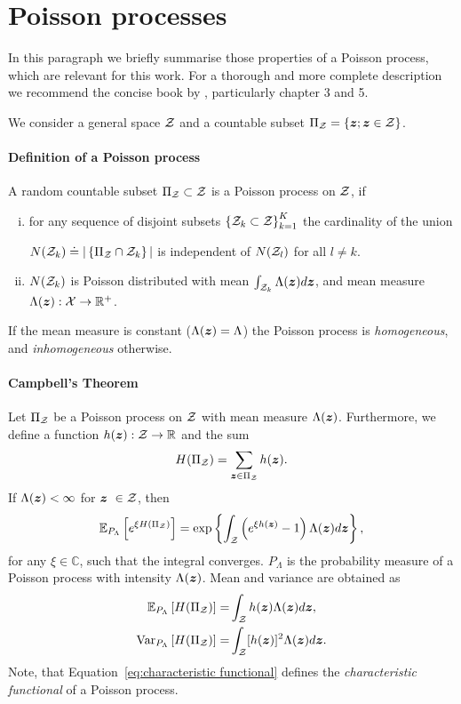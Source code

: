 \appendix

\section{Poisson processes}\label{app:poisson process}
In this paragraph we briefly summarise those properties of a Poisson process, which are relevant for this work.
For a thorough and more complete description we recommend the concise book by \citet{kingman1993poisson}, particularly chapter 3 and 5.

We consider a general space $\mathcal{Z}$ and a countable subset $\Pi_{\mathcal{Z}} = \left\lbrace \boldsymbol{z};\boldsymbol{z}\in \mathcal{Z} \right\rbrace$.

\paragraph{Definition of a Poisson process} A random countable subset $\Pi_{\mathcal{Z}} \subset \mathcal{Z}$ is a Poisson process on $\mathcal{Z}$, if 
\begin{enumerate}[i)]
\item for any sequence of disjoint subsets $\left\lbrace \mathcal{Z}_k\subset \mathcal{Z} \right\rbrace_{k=1}^K$ the cardinality of the union 

$N(\mathcal{Z}_k)\doteq \vert \left\lbrace \Pi_{\mathcal{Z}}\cap\mathcal{Z}_k \right\rbrace\vert$ is independent of $N(\mathcal{Z}_l)$ for all $l\neq k$.
\item  $N(\mathcal{Z}_k)$ is Poisson distributed with mean $\int_{\mathcal{Z}_k}\Lambda(\boldsymbol{z})d\boldsymbol{z}$, and mean measure $\Lambda(\boldsymbol{z}):\mathcal{X} \rightarrow \mathbb{R}^{+}$.
\end{enumerate}

If the mean measure is constant ($\Lambda(\boldsymbol{z})=\Lambda$) the Poisson process is {\it homogeneous}, and {\it inhomogeneous} otherwise. 


\paragraph{Campbell's Theorem} Let $\Pi_{\mathcal{Z}}$ be a Poisson process on $\mathcal{Z}$ with mean measure $\Lambda(\boldsymbol{z})$. Furthermore, we define a function $h(\boldsymbol{z}):\mathcal{Z}\rightarrow \mathbb{R}$ and the sum 
\begin{equation}
H(\Pi_{\mathcal{Z}}) = \sum_{\boldsymbol{z}\in\Pi_{\mathcal{Z}}}h(\boldsymbol{z}).
\end{equation}
If $\Lambda(\boldsymbol{z})<\infty$ for $\boldsymbol{z}~\in\mathcal{Z}$, then
\begin{equation}\label{eq:characteristic functional}
\mathbb{E}_{P_{\Lambda}}\left[ e^{\xi H(\Pi_{\mathcal{Z}})} \right] = \exp\left\{\int_{\mathcal{Z}} \left(e^{\xi h(\boldsymbol{z})} - 1\right)\Lambda(\boldsymbol{z})d\boldsymbol{z} \right\},
\end{equation}
for any $\xi\in\mathbb{C}$, such that the integral converges. $P_{\Lambda}$ is the probability measure of a Poisson process with intensity $\Lambda(\boldsymbol{z})$. Mean and variance are obtained as 
\begin{align}
\mathbb{E}_{P_{\Lambda}}\left[ H(\Pi_{\mathcal{Z}}) \right] = & \int_{\mathcal{Z}}h(\boldsymbol{z})\Lambda(\boldsymbol{z})d\boldsymbol{z}, \\
{\rm Var}_{P_{\Lambda}}\left[H(\Pi_{\mathcal{Z}})\right] = & \int_{\mathcal{Z}}[h(\boldsymbol{z})]^2\Lambda(\boldsymbol{z})d\boldsymbol{z}.
\end{align}
Note, that Equation~\eqref{eq:characteristic functional} defines the {\it characteristic functional} of a Poisson process.

